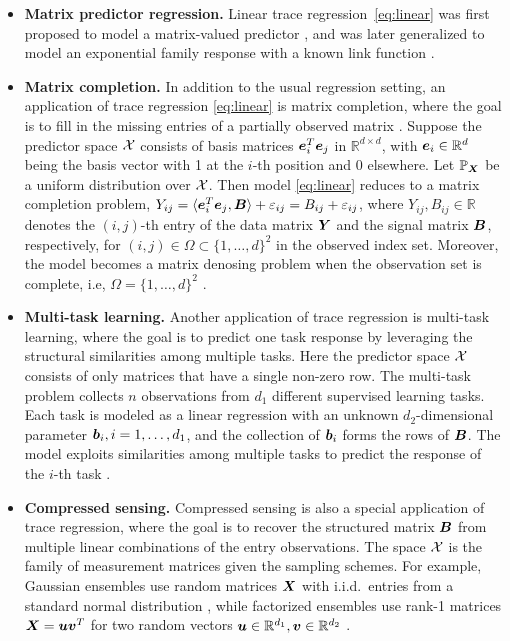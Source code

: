 \documentclass[aos]{imsart}
\theoremstyle{definition}
\begin{document}
\begin{itemize}
\item{\bf Matrix predictor regression.} Linear trace regression~\eqref{eq:linear} was first proposed to model a matrix-valued predictor \citep{zhou2014regularized, wang2014network}, and was later generalized to model an exponential family response with a known link function \citep{wang2017generalized, fan2019generalized}. 
\smallskip

\item {\bf Matrix completion.} In addition to the usual regression setting, an application of trace regression \eqref{eq:linear} is matrix completion, where the goal is to fill in the missing entries of a partially observed matrix \citep{Cai2016}. Suppose the predictor space $\mathcal{X}$ consists of basis matrices $\bm{e}^T_i\bm{e}_j$ in $\mathbb{R}^{d\times d}$, with $\bm{e}_i\in\mathbb{R}^{d}$ being the basis vector with 1 at the $i$-th position and 0 elsewhere. Let $\mathbb{P}_{\bm X}$ be a uniform distribution over $\mathcal{X}$. Then model \eqref{eq:linear} reduces to a matrix completion problem, $Y_{ij}=\langle \bm{e}^T_i \bm{e}_j,\bm B \rangle +\varepsilon_{ij}= B_{ij}+\varepsilon_{ij}$, where $Y_{ij}, B_{ij}\in\mathbb{R}$ denotes the $(i,j)$-th entry of the data matrix $\bm Y$ and the signal matrix $\bm B$, respectively, for $(i,j) \in \Omega\subset\{1,\ldots,d\}^2$ in the observed index set. Moreover, the model becomes a matrix denosing problem when the observation set is complete, i.e, $\Omega=\{1,\ldots,d\}^2$ \citep{Ma2016}. 
\smallskip

\item {\bf Multi-task learning.} Another application of trace regression is multi-task learning, where the goal is to predict one task response by leveraging the structural similarities among multiple tasks. Here the predictor space $\mathcal{X}$ consists of only matrices that have a single non-zero row. The multi-task problem collects $n$ observations from $d_1$ different supervised learning tasks. Each task is modeled as a linear regression with an unknown $d_2$-dimensional parameter $\bm{b}_i, i=1,\ldots,d_1$, and the collection of $\bm{b}_i$ forms the rows of $\bm B$. The model exploits similarities among multiple tasks to predict the response of the $i$-th task \citep{caruana1997multitask,fan2019generalized}. 
\smallskip

\item {\bf Compressed sensing.} Compressed sensing is also a special application of trace regression, where the goal is to recover the structured matrix $\bm B$ from multiple linear combinations of the entry observations. The space $\mathcal{X}$ is the family of measurement matrices given the sampling schemes. For example, Gaussian ensembles use random matrices $\bm X$ with i.i.d.\ entries from a standard normal distribution \citep{candes2011tight}, while factorized ensembles use rank-1 matrices $\bm X=\bm{u}\bm{v}^T$ for two random vectors $\bm{u}\in\mathbb{R}^{d_1}, \bm{v}\in\mathbb{R}^{d_2}$ \cite{recht2010guaranteed}.
\end{itemize}
\end{document}

